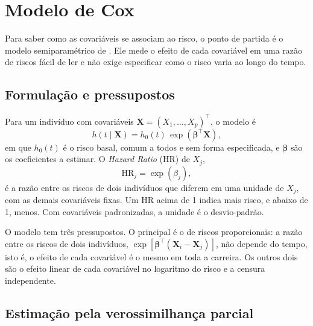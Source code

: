 \section{Modelo de Cox}
\label{sec:cox}

Para saber como as covariáveis se associam ao risco, o ponto de partida é o modelo semiparamétrico de \citet{cox1972}. Ele mede o efeito de cada covariável em uma razão de riscos fácil de ler e não exige especificar como o risco varia ao longo do tempo.

    \subsection{Formulação e pressupostos}
    \label{subsec:cox_modelo}

Para um indivíduo com covariáveis $\mathbf{X} = (X_1, \ldots, X_p)^{\top}$, o modelo é
\begin{equation}
    h(t \mid \mathbf{X})
    = h_0(t)\,\exp\!\left(\boldsymbol{\beta}^{\top}\mathbf{X}\right),
    \label{eq:cox}
\end{equation}
em que $h_0(t)$ é o risco basal, comum a todos e sem forma especificada, e $\boldsymbol{\beta}$ são os coeficientes a estimar. O \textit{Hazard Ratio} (HR) de $X_j$,
\begin{equation}
    \mathrm{HR}_j = \exp(\beta_j),
    \label{eq:hr}
\end{equation}
é a razão entre os riscos de dois indivíduos que diferem em uma unidade de $X_j$, com as demais covariáveis fixas. Um HR acima de 1 indica mais risco, e abaixo de 1, menos. Com covariáveis padronizadas, a unidade é o desvio-padrão.

O modelo tem três pressupostos. O principal é o de riscos proporcionais: a razão entre os riscos de dois indivíduos, $\exp[\boldsymbol{\beta}^{\top}(\mathbf{X}_i - \mathbf{X}_j)]$, não depende do tempo, isto é, o efeito de cada covariável é o mesmo em toda a carreira. Os outros dois são o efeito linear de cada covariável no logaritmo do risco e a censura independente.

    \subsection{Estimação pela verossimilhança parcial}
    \label{subsec:cox_estimacao}

